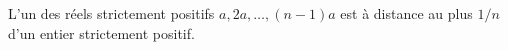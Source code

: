 L'un des réels strictement positifs $a, 2a, \ldots, (n - 1)a$ est à distance au plus $1/n$ d'un entier strictement positif.
